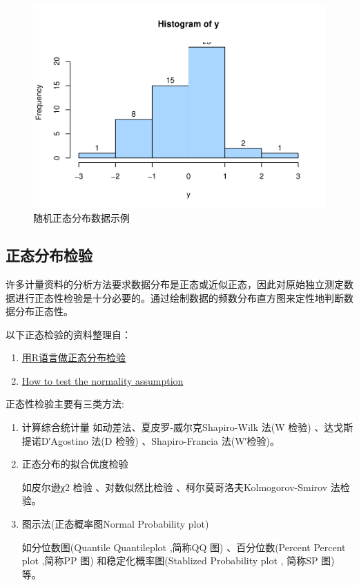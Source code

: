 \documentclass[
]{article}
\begin{document}
\begin{figure}

{\centering \includegraphics[width=0.49\linewidth,height=0.49\textheight]{figs/rnorm} 

}

\caption{随机正态分布数据示例}\label{fig:rnorm}
\end{figure}

\hypertarget{ux6b63ux6001ux5206ux5e03ux68c0ux9a8c}{%
\subsection{正态分布检验}\label{ux6b63ux6001ux5206ux5e03ux68c0ux9a8c}}

许多计量资料的分析方法要求数据分布是正态或近似正态，因此对原始独立测定数据进行正态性检验是十分必要的。通过绘制数据的频数分布直方图来定性地判断数据分布正态性。

以下正态检验的资料整理自：

\begin{enumerate}
\def\labelenumi{\arabic{enumi}.}
\item
  \href{https://blog.csdn.net/u013524655/article/details/41053105?utm_medium=distribute.pc_relevant.none-task-blog-baidulandingword-7\&spm=1001.2101.3001.4242}{用R语言做正态分布检验}
\item
  \href{https://www.statsandr.com/blog/do-my-data-follow-a-normal-distribution-a-note-on-the-most-widely-used-distribution-and-how-to-test-for-normality-in-r/}{How to test the normality assumption}
\end{enumerate}

正态性检验主要有三类方法:

\begin{enumerate}
\def\labelenumi{\arabic{enumi}.}
\item
  计算综合统计量
  如动差法、夏皮罗-威尔克Shapiro-Wilk 法(W 检验) 、达戈斯提诺D′Agostino 法(D 检验) 、Shapiro-Francia 法(W′检验)。
\item
  正态分布的拟合优度检验

  如皮尔逊χ2 检验 、对数似然比检验 、柯尔莫哥洛夫Kolmogorov-Smirov 法检验。
\item
  图示法(正态概率图Normal Probability plot)

  如分位数图(Quantile Quantileplot ,简称QQ 图) 、百分位数(Percent Percent plot ,简称PP 图) 和稳定化概率图(Stablized Probability plot ,
  简称SP 图) 等。
\end{enumerate}
\end{document}
